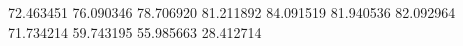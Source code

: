 72.463451
76.090346
78.706920
81.211892
84.091519
81.940536
82.092964
71.734214
59.743195
55.985663
28.412714
